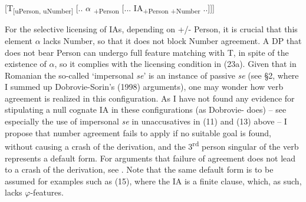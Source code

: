 \documentclass[output=paper]{langsci/langscibook}
\begin{document}
\ea%
    \label{ex:key:24}
    \gll\\
        \\
    \glt
    \z

          [T\textsubscript{[uPerson, uNumber]}  [.. $\alpha $\textsubscript{ +Person}  [... IA\textsubscript{+Person +Number} ..]]]

For the selective licensing of IAs, depending on +/- Person, it is crucial that this element $\alpha $ lacks Number, so that it does not block Number agreement. A DP that does not bear Person can undergo full feature matching with T, in spite of the existence of $\alpha $, so it complies with the licensing condition in (23a). Given that in Romanian the so-called ‘impersonal \textit{se}’ is an instance of passive \textit{se} (see §2, where I summed up Dobrovie-Sorin’s (1998) arguments), one may wonder how verb agreement is realized in this configuration. As I have not found any evidence for stipulating a null cognate IA in these configurations (as Dobrovie-\citealt{Sorin1998} does) – see especially the use of impersonal \textit{se} in unaccusatives in (11) and (13) above – I propose that number agreement fails to apply if no suitable goal is found, without causing a crash of the derivation, and the 3\textsuperscript{rd} person singular of the verb represents a default form. For arguments that failure of agreement does not lead to a crash of the derivation, see \citet{Preminger2014}. Note that the same default form is to be assumed for examples such as (15), where the IA is a finite clause, which, as such, lacks $\varphi $-features.
\end{document}
